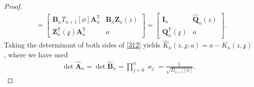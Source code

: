 \documentclass[pdftex]{sigma}
\numberwithin{equation}{section}
\begin{document}
\begin{proof}
\begin{align}
& = \begin{bmatrix}
						\boldsymbol{B}_{n} T_{n+1}[\phi] \boldsymbol{A}^{\mathsf T}_{n} & \boldsymbol{B}_{n} \boldsymbol{Z}_{n}(z) \\
						\boldsymbol{Z}^{\mathsf T}_{n}(\mathcal{z}) \boldsymbol{A}^{\mathsf T}_{n} & a
					\end{bmatrix} = \begin{bmatrix}
						\boldsymbol{I}_{n}	 & \boldsymbol{\widehat{Q}}_n(z) \\
						\boldsymbol{Q}^{\mathsf T}_n(\mathcal{z}) & a
					\end{bmatrix}.\label{312}
			\end{align}
			Taking the determinant of both sides of \eqref{312} yields $\widehat{K}_{n}(z,\mathcal{z};a) = a - K_{n}(z,\mathcal{z})$, where we
			have used \begin{gather*}
				\det \boldsymbol{\widehat{A}}_{n} = \det 	\boldsymbol{\widehat{B}}_{n} = \prod_{j=0}^{n} \varkappa_j = \frac{1}{\sqrt{D_{n+1}[\phi]}}.\tag*{\qed}
			\end{gather*}		\renewcommand{\qed}{}
		\end{proof}
\end{document}
